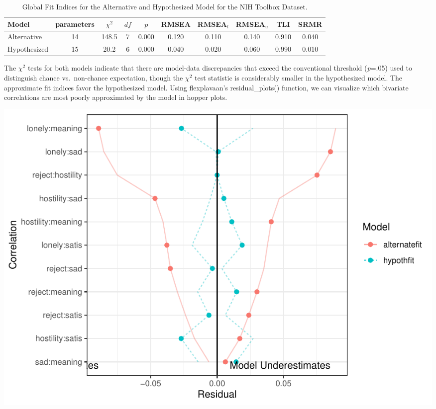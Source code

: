 \documentclass[
  english,
  doc]{apa6}
\begin{document}
\begin{table}[tbp]

\begin{center}
\begin{threeparttable}

\caption{\label{tab:unnamed-chunk-2}Global Fit Indices for the Alternative and Hypothesized Model for the NIH Toolbox Dataset.}

\begin{tabular}{lccccccccc}
\toprule
Model & parameters & $\chi^2$ & $df$ & $p$ & RMSEA & RMSEA$_{l}$ & RMSEA$_{u}$ & TLI & SRMR\\
\midrule
Alternative & 14 & 148.5 & 7 & 0.000 & 0.120 & 0.110 & 0.140 & 0.910 & 0.040\\
Hypothesized & 15 & 20.2 & 6 & 0.000 & 0.040 & 0.020 & 0.060 & 0.990 & 0.010\\
\bottomrule
\end{tabular}

\end{threeparttable}
\end{center}

\end{table}

The \(\chi^2\) tests for both models indicate that there are model-data discrepancies that exceed the conventional threshold (\emph{p}=.05) used to distinguish chance vs.~non-chance expectation, though the \(\chi^2\) test statistic is considerably smaller in the hypothesized model. The approximate fit indices favor the hypothesized model.
Using flexplavaan's residual\_plots() function, we can visualize which bivariate correlations are most poorly approximated by the model in hopper plots.

\includegraphics{flexplavaan_draft_files/figure-latex/unnamed-chunk-3-1.pdf}
\end{document}

